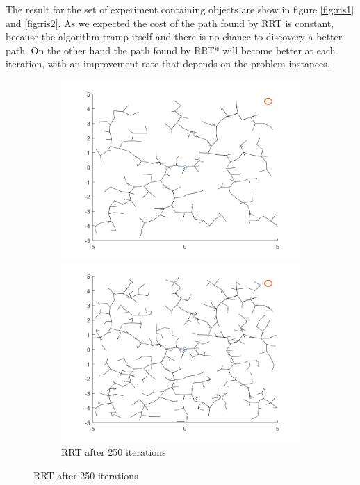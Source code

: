 \documentclass[10pt]{article}
\begin{document}
	The result for the set of experiment containing objects are show in figure \ref{fig:ris1} and \ref{fig:ris2}. As we expected the cost of the path found by RRT is constant, because the algorithm tramp itself and there is no chance to discovery a better path. On the other hand the path found by RRT* will become better at each iteration, with an improvement rate that depends on the problem instances.
	  
\begin{figure}[!hbt]
	\begin{subfigure}{\textwidth}
		\centering
		\begin{minipage}[b]{0.32\linewidth}
		\includegraphics[width=\linewidth]{empty_RTT_250_dist_0}
		\caption{RRT after 250 iterations}
	\end{minipage}
		\begin{minipage}[b]{0.32\linewidth}
		\includegraphics[width=\linewidth]{empty_RTT_500_dist_0}

\end{minipage}
\end{subfigure}
\end{figure}
\end{document}
